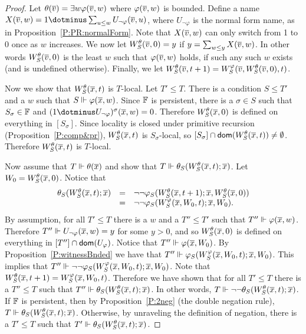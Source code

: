 \begin{proof}
Let $\theta(\overline{v})=\exists w\varphi(\overline{v},w)$ where $\varphi(\overline{v},w)$ is bounded.
Define a name $X(\tup{v},w)=1\dotminus\sum_{u\leq w}U_{\neg\varphi}(\tup{v},u)$,
where $U_{\neg\varphi}$ is the normal form name, as in Proposition~\ref{P:PR:normalForm}.
Note that $X(\overline{v},w)$ can only switch from 1 to 0 once as $w$ increases.
We now let $W^\theta_S(\overline{v},0)=y$ if $y=\sum_{w\leq y}X(\overline{v},w)$.
In other words $W^\theta_S(\overline{v},0)$ is the least $w$ such that
$\varphi(\overline{v},w)$ holds, if such any such $w$ exists
(and is undefined otherwise).
Finally, we let $W^\theta_S(\overline{v},t+1)=W^\varphi_S(\overline{v},W^\theta_S(\overline{v},0),t)$.

Now we show that $W^\theta_S(\overline{x},t)$ is $T$-local.
Let $T'\leq T$.
There is a condition $S\leq T'$ and a $w$ such that $S\Vdash\varphi(\overline{x},w)$.
Since $\mathbb{F}$ is persistent, there is a $\sigma\in S$
such that $S_\sigma\in\mathbb{F}$ and
$(1\dotminus U_{\neg\varphi})^\sigma(\tup{x},w)=0$.
Therefore $W^\theta_S(\overline{x},0)$ is defined on everything in $[S_{\sigma}]$.
Since locality is closed under primitive recursion (Proposition~\ref{P:comp&pr}),
$W^\theta_S(\overline{x},t)$ is $S_\sigma$-local, so
$[S_\sigma]\cap\mathsf{dom}(W^\theta_S(\overline{x},t))\neq\emptyset$.
Therefore $W^\theta_S(\overline{x},t)$ is $T$-local.

Now assume that $T\Vdash\theta(\overline{x})$ and show that
$T\Vdash\theta_S(W^\theta_S(\overline{x},t);\overline{x})$.
Let $W_0=W^\theta_S(\overline{x},0)$.
Notice that
$$\begin{array}{lll}
\theta_S(W^\theta_S(\overline{x},t);\overline{x}) & = & \neg\neg\varphi_S(W^\theta_S(\overline{x},t+1);\overline{x},W_S^\theta(\overline{x},0))\\
& = & \neg\neg\varphi_S(W^\varphi_S(\overline{x},W_0,t);\overline{x},W_0).
\end{array}$$
By assumption, for all $T'\leq T$ there is a $w$ and a $T''\leq T'$
such that $T''\Vdash\varphi(\overline{x},w)$.
Therefore $T''\Vdash U_{\neg\varphi}(\overline{x},w)=y$ for some $y>0$,
and so $W^\theta_S(\overline{x},0)$ is defined on everything in $[T'']\cap\mathsf{dom}(U_\varphi)$.
Notice that $T''\Vdash\varphi(\overline{x},W_0)$.
By Proposition~\ref{P:witnessBnded} we have that
$T''\Vdash\varphi_S(W^\varphi_S(\overline{x},W_0,t);\overline{x},W_0)$.
This implies that $T''\Vdash\neg\neg\varphi_S(W^\varphi_S(\overline{x},W_0,t);\overline{x},W_0)$.
Note that $W^\theta_S(\overline{x},t+1)=W^\varphi_S(\overline{x},W_0,t)$.
Therefore we have shown that for all $T'\leq T$ there is a $T''\leq T$
such that $T''\Vdash\theta_S(W^\theta_S(\overline{x},t);\overline{x})$.
In other words, $T\Vdash\neg\neg\theta_S(W^\theta_S(\overline{x},t);\overline{x})$.
If $\mathbb{F}$ is persistent, then by Proposition~\ref{P:2neg} (the double negation rule),
$T\Vdash\theta_S(W^\theta_S(\overline{x},t);\overline{x})$.
Otherwise, by unraveling the definition of negation, there is a $T'\leq T$
such that $T'\Vdash\theta_S(W^\theta_S(\overline{x},t);\overline{x})$.
\end{proof}

